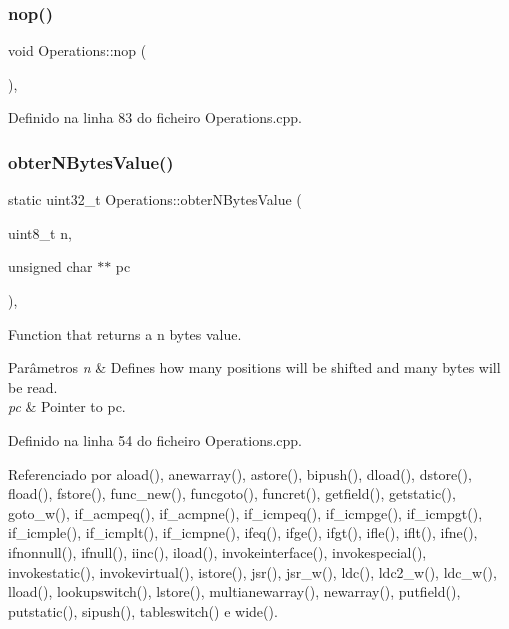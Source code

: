 \subsubsection{\texorpdfstring{nop()}{nop()}}
{\footnotesize\ttfamily void Operations\+::nop (\begin{DoxyParamCaption}{ }\end{DoxyParamCaption})\hspace{0.3cm}{\ttfamily [static]}, {\ttfamily [private]}}



Definido na linha 83 do ficheiro Operations.\+cpp.

\mbox{\label{classOperations_a6906050cc72d774f77d8ba33607b1c62}} 
\subsubsection{\texorpdfstring{obter\+N\+Bytes\+Value()}{obterNBytesValue()}}
{\footnotesize\ttfamily static uint32\+\_\+t Operations\+::obter\+N\+Bytes\+Value (\begin{DoxyParamCaption}\item[{uint8\+\_\+t}]{n,  }\item[{unsigned char $\ast$$\ast$}]{pc }\end{DoxyParamCaption})\hspace{0.3cm}{\ttfamily [static]}, {\ttfamily [private]}}



Function that returns a n bytes value. 


\begin{DoxyParams}{Parâmetros}
{\em n} & Defines how many positions will be shifted and many bytes will be read. \\
\hline
{\em pc} & Pointer to pc. \\
\hline
\end{DoxyParams}


Definido na linha 54 do ficheiro Operations.\+cpp.



Referenciado por aload(), anewarray(), astore(), bipush(), dload(), dstore(), fload(), fstore(), func\+\_\+new(), funcgoto(), funcret(), getfield(), getstatic(), goto\+\_\+w(), if\+\_\+acmpeq(), if\+\_\+acmpne(), if\+\_\+icmpeq(), if\+\_\+icmpge(), if\+\_\+icmpgt(), if\+\_\+icmple(), if\+\_\+icmplt(), if\+\_\+icmpne(), ifeq(), ifge(), ifgt(), ifle(), iflt(), ifne(), ifnonnull(), ifnull(), iinc(), iload(), invokeinterface(), invokespecial(), invokestatic(), invokevirtual(), istore(), jsr(), jsr\+\_\+w(), ldc(), ldc2\+\_\+w(), ldc\+\_\+w(), lload(), lookupswitch(), lstore(), multianewarray(), newarray(), putfield(), putstatic(), sipush(), tableswitch() e wide().

